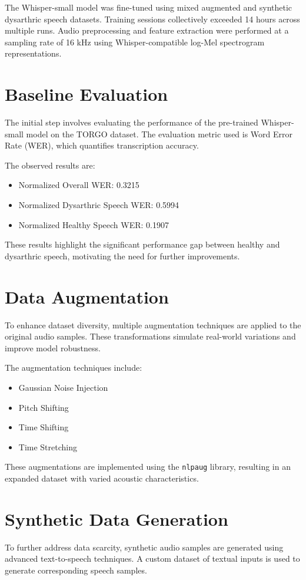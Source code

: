 The Whisper-small model was fine-tuned using mixed augmented and synthetic dysarthric speech datasets. Training sessions collectively exceeded 14 hours across multiple runs. Audio preprocessing and feature extraction were performed at a sampling rate of 16 kHz using Whisper-compatible log-Mel spectrogram representations.

\section{Baseline Evaluation}
The initial step involves evaluating the performance of the pre-trained Whisper-small model on the TORGO dataset. The evaluation metric used is Word Error Rate (WER), which quantifies transcription accuracy.

The observed results are:
\begin{itemize}
\item Normalized Overall WER: 0.3215
\item Normalized Dysarthric Speech WER: 0.5994
\item Normalized Healthy Speech WER: 0.1907
\end{itemize}

These results highlight the significant performance gap between healthy and dysarthric speech, motivating the need for further improvements.

\section{Data Augmentation}
To enhance dataset diversity, multiple augmentation techniques are applied to the original audio samples. These transformations simulate real-world variations and improve model robustness.

The augmentation techniques include:
\begin{itemize}
\item Gaussian Noise Injection
\item Pitch Shifting
\item Time Shifting
\item Time Stretching
\end{itemize}

These augmentations are implemented using the \texttt{nlpaug} library, resulting in an expanded dataset with varied acoustic characteristics.

\section{Synthetic Data Generation}
To further address data scarcity, synthetic audio samples are generated using advanced text-to-speech techniques. A custom dataset of textual inputs is used to generate corresponding speech samples.

